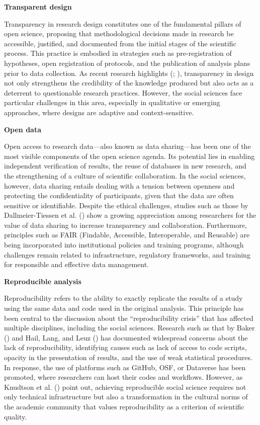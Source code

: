 \documentclass[
  letterpaper,
]{article}
\begin{document}
\textbf{Transparent design}

Transparency in research design constitutes one of the fundamental
pillars of open science, proposing that methodological decisions made in
research be accessible, justified, and documented from the initial
stages of the scientific process. This practice is embodied in
strategies such as pre-registration of hypotheses, open registration of
protocols, and the publication of analysis plans prior to data
collection. As recent research highlights
(;
),
transparency in design not only strengthens the credibility of the
knowledge produced but also acts as a deterrent to questionable research
practices. However, the social sciences face particular challenges in
this area, especially in qualitative or emerging approaches, where
designs are adaptive and context-sensitive.

\textbf{Open data}

Open access to research data---also known as data sharing---has been one
of the most visible components of the open science agenda. Its potential
lies in enabling independent verification of results, the reuse of
databases in new research, and the strengthening of a culture of
scientific collaboration. In the social sciences, however, data sharing
entails dealing with a tension between openness and protecting the
confidentiality of participants, given that the data are often sensitive
or identifiable. Despite the ethical challenges, studies such as those
by Dallmeier-Tiessen et al.
() show a growing
appreciation among researchers for the value of data sharing to increase
transparency and collaboration. Furthermore, principles such as FAIR
(Findable, Accessible, Interoperable, and Reusable) are being
incorporated into institutional policies and training programs, although
challenges remain related to infrastructure, regulatory frameworks, and
training for responsible and effective data management.

\textbf{Reproducible analysis}

Reproducibility refers to the ability to exactly replicate the results
of a study using the same data and code used in the original analysis.
This principle has been central to the discussion about the
``reproducibility crisis'' that has affected multiple disciplines,
including the social sciences. Research such as that by Baker
() and Hail, Lang, and Leuz
() has documented
widespread concerns about the lack of reproducibility, identifying
causes such as lack of access to code scripts, opacity in the
presentation of results, and the use of weak statistical procedures. In
response, the use of platforms such as GitHub, OSF, or Dataverse has
been promoted, where researchers can host their codes and workflows.
However, as Knudtson et al. ()
point out, achieving reproducible social science requires not only
technical infrastructure but also a transformation in the cultural norms
of the academic community that values reproducibility as a criterion of
scientific quality.
\end{document}
